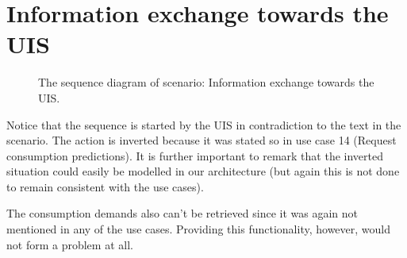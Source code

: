 \section{Information exchange towards the UIS}

\begin{figure}
	\begin{centering}
		\caption{The sequence diagram of scenario: Information exchange towards the
		UIS.}
		\label{fig:scenario-5-8}
	\end{centering}
\end{figure}

\npar Notice that the sequence is started by the UIS in contradiction to the
text in the scenario. The action is inverted because it was stated so in use
case 14 (Request consumption predictions). It is further important to remark
that the inverted situation could easily be modelled in our architecture (but
again this is not done to remain consistent with the use cases).

\npar The consumption demands also can't be retrieved since it was again not
mentioned in any of the use cases. Providing this functionality, however, would
not form a problem at all.

